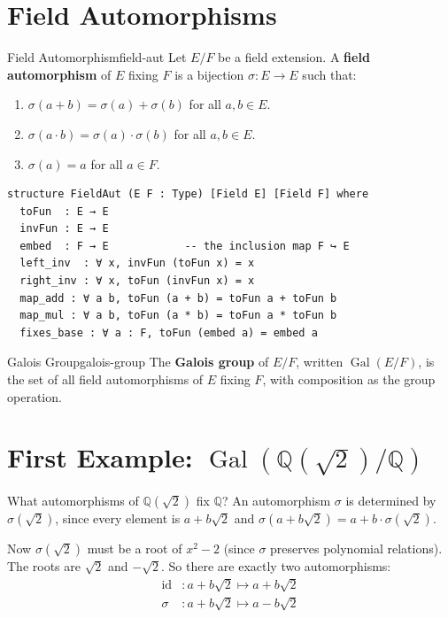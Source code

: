 \documentclass[11pt, a4paper, oneside]{book}
\newcommand{\Q}{\mathbb{Q}}
\newcommand{\Gal}{\operatorname{Gal}}
\newcommand{\id}{\operatorname{id}}
\begin{document}
\section{Field Automorphisms}

\begin{defn}{Field Automorphism}{field-aut}
Let $E/F$ be a field extension. A \textbf{field automorphism} of $E$ fixing
$F$ is a bijection $\sigma : E \to E$ such that:
\begin{enumerate}[nosep, label=(\roman*)]
\item $\sigma(a + b) = \sigma(a) + \sigma(b)$ for all $a, b \in E$.
\item $\sigma(a \cdot b) = \sigma(a) \cdot \sigma(b)$ for all $a, b \in E$.
\item $\sigma(a) = a$ for all $a \in F$.
\end{enumerate}
\end{defn}

\begin{leanbox}
\begin{verbatim}
structure FieldAut (E F : Type) [Field E] [Field F] where
  toFun  : E → E
  invFun : E → E
  embed  : F → E            -- the inclusion map F ↪ E
  left_inv  : ∀ x, invFun (toFun x) = x
  right_inv : ∀ x, toFun (invFun x) = x
  map_add : ∀ a b, toFun (a + b) = toFun a + toFun b
  map_mul : ∀ a b, toFun (a * b) = toFun a * toFun b
  fixes_base : ∀ a : F, toFun (embed a) = embed a
\end{verbatim}
\end{leanbox}

\begin{defn}{Galois Group}{galois-group}
The \textbf{Galois group} of $E/F$, written $\Gal(E/F)$, is the set of all
field automorphisms of $E$ fixing $F$, with composition as the group operation.
\end{defn}

\section{First Example: $\Gal(\Q(\sqrt{2})/\Q)$}

What automorphisms of $\Q(\sqrt{2})$ fix $\Q$? An automorphism $\sigma$ is
determined by $\sigma(\sqrt{2})$, since every element is $a + b\sqrt{2}$ and
$\sigma(a + b\sqrt{2}) = a + b \cdot \sigma(\sqrt{2})$.

Now $\sigma(\sqrt{2})$ must be a root of $x^2 - 2$ (since $\sigma$ preserves
polynomial relations). The roots are $\sqrt{2}$ and $-\sqrt{2}$. So there are
exactly two automorphisms:
\begin{align*}
  \id &: a + b\sqrt{2} \mapsto a + b\sqrt{2} \\
  \sigma &: a + b\sqrt{2} \mapsto a - b\sqrt{2}
\end{align*}
\end{document}
